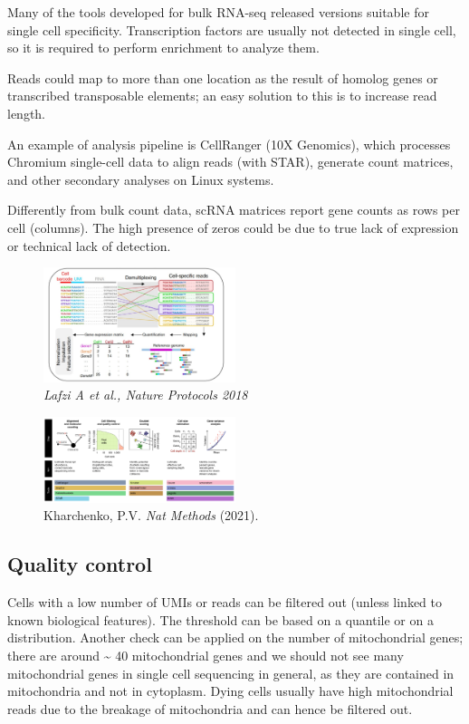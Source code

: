 Many of the tools developed for bulk RNA-seq released versions suitable
for single cell specificity. Transcription factors are usually not
detected in single cell, so it is required to perform enrichment to
analyze them.

Reads could map to more than one location as the result of homolog genes
or transcribed transposable elements; an easy solution to this is to
increase read length.

An example of analysis pipeline is CellRanger (10X Genomics), which
processes Chromium single-cell data to align reads (with STAR), generate
count matrices, and other secondary analyses on Linux systems.

Differently from bulk count data, scRNA matrices report gene counts as
rows per cell (columns). The high presence of zeros could be due to true
lack of expression or technical lack of detection.

\begin{figure}
\centering
\includegraphics[width=0.5\textwidth]{images/Screenshot-1.png}
\caption{\emph{Lafzi A et al., Nature Protocols 2018}}
\end{figure}


\begin{figure}
\centering
\includegraphics[width=0.5\textwidth]{images/Screenshot-2.png}
\caption{Kharchenko, P.V. \emph{Nat Methods} (2021).}
\end{figure}


\hypertarget{quality-control}{%
\subsection{Quality control}\label{quality-control}}

Cells with a low number of UMIs or reads can be filtered out (unless
linked to known biological features). The threshold can be based on a
quantile or on a distribution. Another check can be applied on the
number of mitochondrial genes; there are around \textasciitilde{} 40
mitochondrial genes and we should not see many mitochondrial genes in
single cell sequencing in general, as they are contained in mitochondria
and not in cytoplasm. Dying cells usually have high mitochondrial reads
due to the breakage of mitochondria and can hence be filtered out.

